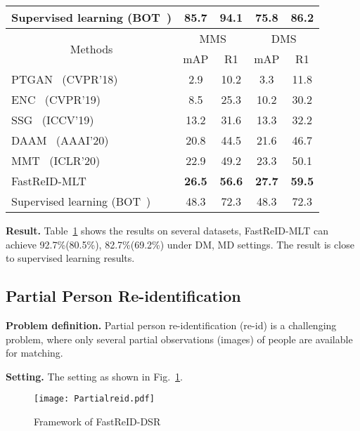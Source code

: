 \documentclass[10pt,twocolumn,letterpaper]{article}
\begin{document}
\begin{table}[t]
\begin{center}
\begin{tabular}{|l|cc|cc|}
                Supervised learning (BOT~\cite{Luo2019CVPRWorkshops})&85.7&94.1 &75.8&86.2   \\\hline
                \hline 
                

                \multicolumn{1}{|c|}{\multirow{2}{*}{Methods}} & \multicolumn{2}{c|}{MMS} & \multicolumn{2}{c|}{DMS} \\
                \cline{2-5}
                \multicolumn{1}{|c|}{} & mAP & R1 & mAP & R1  \\ 
                \hline 
                PTGAN~\cite{wei2018person} (CVPR'18) & 2.9 & 10.2  & 3.3 & 11.8  \\    
                ENC~\cite{zhong2019invariance} (CVPR'19) & 8.5 & 25.3  & 10.2 & 30.2  \\
                SSG~\cite{yang2019selfsimilarity} (ICCV'19) & 13.2 & 31.6 & 13.3 & 32.2  \\
                DAAM~\cite{Huang2020aaai} (AAAI'20)& 20.8 &44.5  & 21.6 & 46.7  \\
                
                MMT~\cite{ge2020mutual} (ICLR'20) & 22.9 & 49.2 &  23.3 & 50.1  \\
                \hline
                FastReID-MLT & \textbf{26.5} & \textbf{56.6}  & \textbf{27.7} & \textbf{59.5}  \\
                Supervised learning (BOT~\cite{Luo2019CVPRWorkshops})&48.3&72.3 &48.3&72.3   \\
                \hline
            \end{tabular}
        \end{center}
        \label{tab:sota}
            \vspace{-10pt}
\end{table}
    
\noindent\textbf{Result.} Table~\ref{tab:sota} shows the results on several datasets, FastReID-MLT can achieve 92.7\%(80.5\%), 82.7\%(69.2\%) under DM, MD settings. The result is close to supervised learning results. 


\subsection{Partial Person Re-identification}
\noindent\textbf{Problem definition.} Partial person re-identification (re-id) is a challenging problem, where only several partial observations (images) of people are available for matching.

\noindent\textbf{Setting.} The setting as shown in Fig.~\ref{fig10}.
\begin{figure}[htp]
    \centering
    \texttt{[image: Partialreid.pdf]}
     \caption{{Framework of FastReID-DSR}}
    \label{fig10}
\end{figure}
\end{document}
